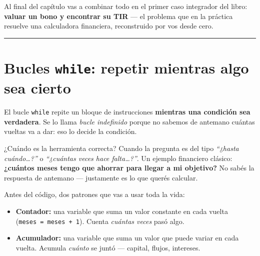 \documentclass[
  spanish,
  letterpaper,
  DIV=11,
  numbers=noendperiod]{scrreprt}
\newenvironment{Shaded}{\begin{snugshade}}{\end{snugshade}}
\newcommand{\NormalTok}[1]{\textcolor[rgb]{0.00,0.23,0.31}{#1}}
\providecommand{\tightlist}{%
  \setlength{\itemsep}{0pt}\setlength{\parskip}{0pt}}
\begin{document}
Al final del capítulo vas a combinar todo en el primer caso integrador
del libro: \textbf{valuar un bono y encontrar su TIR} --- el problema
que en la práctica resuelve una calculadora financiera, reconstruido por
vos desde cero.

\begin{center}\rule{0.5\linewidth}{0.5pt}\end{center}

\section{\texorpdfstring{Bucles \texttt{while}: repetir mientras algo
sea
cierto}{Bucles while: repetir mientras algo sea cierto}}\label{bucles-while-repetir-mientras-algo-sea-cierto}

El bucle \texttt{while} repite un bloque de instrucciones
\textbf{mientras una condición sea verdadera}. Se lo llama \emph{bucle
indefinido} porque no sabemos de antemano cuántas vueltas va a dar: eso
lo decide la condición.

¿Cuándo es la herramienta correcta? Cuando la pregunta es del tipo
\emph{``¿hasta cuándo\ldots?''} o \emph{``¿cuántas veces hace
falta\ldots?''}. Un ejemplo financiero clásico: \textbf{¿cuántos meses
tengo que ahorrar para llegar a mi objetivo?} No sabés la respuesta de
antemano --- justamente es lo que querés calcular.

Antes del código, dos patrones que vas a usar toda la vida:

\begin{itemize}
\tightlist
\item
  \textbf{Contador:} una variable que suma un valor constante en cada
  vuelta (\texttt{meses\ =\ meses\ +\ 1}). Cuenta \emph{cuántas veces}
  pasó algo.
\item
  \textbf{Acumulador:} una variable que suma un valor que puede variar
  en cada vuelta. Acumula \emph{cuánto} se juntó --- capital, flujos,
  intereses.
\end{itemize}

\begin{Shaded}
\end{Shaded}
\end{document}
